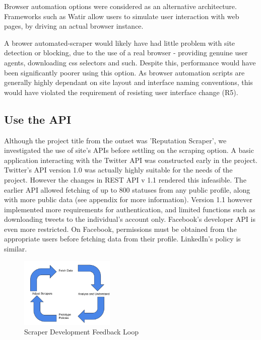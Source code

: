 Browser automation options were considered as an alternative architecture. Frameworks such as Watir allow users to simulate user interaction with web pages, by driving an actual browser instance.

A brower automated-scraper would likely have had little problem with site detection or blocking, due to the use of a real browser - providing genuine user agents, downloading css selectors and such. Despite this, performance would have been significantly poorer using this option. As browser automation scripts are generally highly dependant on site layout and interface naming conventions, this would have violated the requirement of resisting user interface change (R5). 

\subsection{Use the API}

Although the project title from the outset was 'Reputation Scraper', we investigated the use of site's APIs before settling on the scraping option. A basic application interacting with the Twitter API was constructed early in the project. Twitter's API version 1.0 was actually highly suitable for the needs of the project. However the changes in REST API v 1.1 rendered this infeasible. The earlier API allowed fetching of up to 800 statuses from any public profile, along with more public data (see appendix for more information). Version 1.1 however implemented more requirements for authentication, and limited functions such as downloading tweets to the individual's account only. Facebook's developer API is even more restricted. On Facebook, permissions must be obtained from the appropriate users before fetching data from their profile. LinkedIn's policy is similar. %

\begin{figure}[h!]
\centering
\includegraphics[width=0.4\textwidth]{Images/Implementation_Lifecycle.pdf}
\caption{Scraper Development Feedback Loop}
\end{figure}

